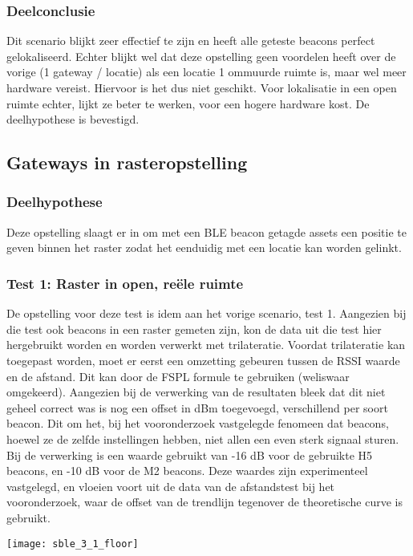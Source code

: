 \subsubsection{Deelconclusie}
Dit scenario blijkt zeer effectief te zijn en heeft alle geteste beacons perfect gelokaliseerd. Echter blijkt wel dat deze opstelling geen voordelen heeft over de vorige (1 gateway / locatie) als een locatie 1 ommuurde ruimte is, maar wel meer hardware vereist. Hiervoor is het dus niet geschikt. Voor lokalisatie in een open ruimte echter, lijkt ze beter te werken, voor een hogere hardware kost. De deelhypothese is bevestigd.

\subsection{Gateways in rasteropstelling}
\subsubsection{Deelhypothese}
Deze opstelling slaagt er in om met een BLE beacon getagde assets een positie te geven binnen het raster zodat het eenduidig met een locatie kan worden gelinkt.

\subsubsection{Test 1: Raster in open, reële ruimte}
\begin{minipage}{0.55\textwidth}
De opstelling voor deze test is idem aan het vorige scenario, test 1. Aangezien bij die test ook beacons in een raster gemeten zijn, kon de data uit die test hier hergebruikt worden en worden verwerkt met trilateratie. Voordat trilateratie kan toegepast worden, moet er eerst een omzetting gebeuren tussen de RSSI waarde en de afstand. Dit kan door de FSPL formule te gebruiken (weliswaar omgekeerd). Aangezien bij de verwerking van de resultaten bleek dat dit niet geheel correct was is nog een offset in dBm toegevoegd, verschillend per soort beacon. Dit om het, bij het vooronderzoek vastgelegde fenomeen dat beacons, hoewel ze de zelfde instellingen hebben, niet allen een even sterk signaal sturen. Bij de verwerking is een waarde gebruikt van -16 dB voor de gebruikte H5 beacons, en -10 dB voor de M2 beacons. Deze waardes zijn experimenteel vastgelegd, en vloeien voort uit de data van de afstandstest bij het vooronderzoek, waar de offset van de trendlijn tegenover de theoretische curve is gebruikt.
\end{minipage}
\hfill
\begin{minipage}{0.42\textwidth}
	\texttt{[image: sble\_3\_1\_floor]}
\end{minipage}


